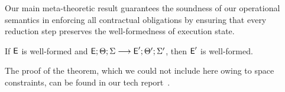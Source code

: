 Our main meta-theoretic result guarantees the soundness of our
operational semantics in enforcing all contractual obligations by
ensuring that every reduction step preserves the well-formedness of
execution state.

\begin{theorem}
\label{lem:core-preservation}
If ${\normalfont \textsf{E}}$ is well-formed and ${\normalfont \textsf{E}}; \Theta; \Sigma \longrightarrow {\normalfont \textsf{E}}'; \Theta';
\Sigma'$, then ${\normalfont \textsf{E}}'$ is well-formed.
\end{theorem}
%

The proof of the theorem, which we could not include here owing to
space constraints, can be found in our tech report~\cite{techrep}.

